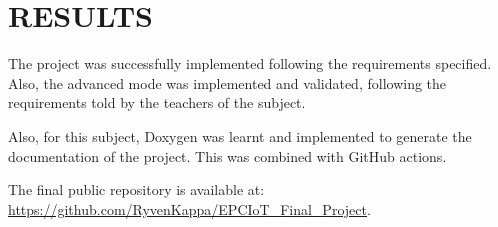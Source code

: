 \section{RESULTS}

The project was successfully implemented following the requirements specified. Also, the advanced mode was implemented and validated, following the requirements told by the teachers of the subject.

Also, for this subject, Doxygen was learnt and implemented to generate the documentation of the project. This was combined with GitHub actions.

The final public repository is available at: \url{https://github.com/RyvenKappa/EPCIoT_Final_Project}.



